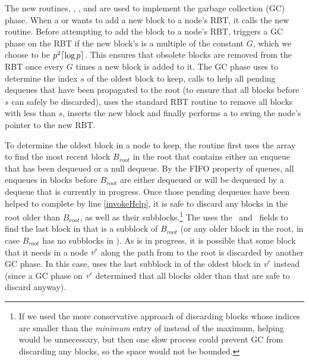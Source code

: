 The new routines, , ,  and  are
used to implement the garbage collection (GC) phase.
When a  or  wants to add a new block to a node's  RBT,
it calls the new  routine.
Before attempting to add the block to a node's RBT,  triggers a GC phase on the RBT if 
the new block's  is a multiple of the constant $G$, which we choose to be $p^2\lceil \log p \rceil$.
This ensures that obsolete blocks are removed from the RBT once every $G$ times a new block is added to it.
The GC phase uses  to determine the index $s$ of the oldest block to keep,
calls  to help all pending dequeues that have been propagated to the root
(to ensure that all blocks before $s$ can safely be discarded),
uses the standard RBT  routine \cite{Tar83}
to remove all blocks with  less than $s$,
inserts the new block
and finally performs a  to swing the node's  pointer to the new RBT.

To determine the oldest block in a node  to keep, the  routine  first
uses the  array to
find the most recent block $B_{root}$ in the root that contains either an enqueue that has been dequeued
or a null dequeue.  By the FIFO property of queues, all enqueues in blocks before $B_{root}$ are either
dequeued or will be dequeued by a dequeue that is currently in progress.  Once those pending dequeues have been
helped to complete by line \ref{invokeHelp},
it is safe to discard any blocks in the root older than $B_{root}$, as well
as their subblocks.\footnote{If we used the more conservative approach of discarding blocks whose indices 
are smaller than the \emph{minimum} entry of  instead of the maximum, helping would be unnecessary, but then one slow process could prevent GC from discarding any blocks, so the space would not be bounded.}
The  uses the \eleft\ and \eright\ fields to find the last block in  that is a subblock
of $B_{root}$ (or any older block in the root, in case $B_{root}$ has no subblocks in ).
As  is in progress, it is possible that some block that it needs in a node $\mbox{\textnormal{\textit{v}}}'$
along the path from  to the root is discarded by another GC phase.
In this case,  uses the last subblock in  of the oldest block in $\mbox{\textnormal{\textit{v}}}'$ instead
(since a GC phase on $\mbox{\textnormal{\textit{v}}}'$ determined that all blocks older than that are safe to discard anyway).

